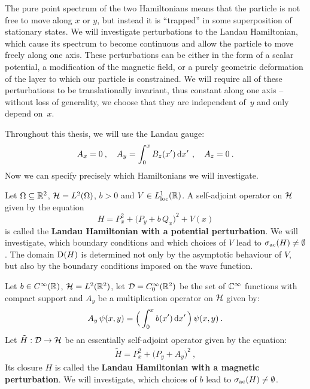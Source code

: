 The pure point spectrum of the two Hamiltonians means that the particle is not free to move along $x$ or $y$, but instead it is “trapped” in some superposition of stationary states. We will investigate perturbations to the Landau Hamiltonian, which cause its spectrum to become continuous and allow the particle to move freely along one axis. These perturbations can be either in the form of a scalar potential, a modification of the magnetic field, or a purely geometric deformation of the layer to which our particle is constrained. We will require all of these perturbations to be translationally invariant, thus constant along one axis – without loss of generality, we choose that they are independent of~$y$ and only depend on~$x$.

Throughout this thesis, we will use the Landau gauge:
\begin{align*}
    A_x = 0 \: , \quad
    A_y = \int_0^x B_z(x') \, \mathrm{d}x' \, \: , \quad
    A_z = 0 \: .
\end{align*}
Now we can specify precisely which Hamiltonians we will investigate.

\begin{defn}
    \label{defn-perturb-potential}
    Let $\Omega \subseteq \mathbb{R}^2$, $\mathcal{H} = L^2(\Omega)$, $b>0$ and $V \in L^1_{\text{loc}}(\mathbb{R})$. A self-adjoint operator on $\mathcal{H}$ given by the equation
    \begin{equation*}
        H
        = P^2_x
        + \big( P_y + b \, Q_x \big)^2
        + V(x)
    \end{equation*}
    is called the \textbf{Landau Hamiltonian with a potential perturbation}. We will investigate, which boundary conditions and which choices of $V$ lead to $\sigma_{\mathrm{ac}}(H) \neq \emptyset$. The domain $\mathrm{D}(H)$ is determined not only by the asymptotic behaviour of $V$, but also by the boundary conditions imposed on the wave function.
\end{defn}

\begin{defn}
    \label{defn-perturb-magnet}
    Let $b \in C^\infty(\mathbb{R})$, $\mathcal{H} = L^2(\mathbb{R}^2)$, let $\mathcal{D} = C^\infty_0(\mathbb{R}^2)$ be the set of $\mathbb{C}^\infty$ functions with compact support and $A_y$ be a multiplication operator on $\mathcal{H}$ given by:
    \begin{align*}
        A_y \, \psi(x, y) = \Big( \int_0^x b(x') \, \mathrm{d}x' \, \Big) \, \psi(x, y) \: .
    \end{align*}
    Let $\tilde H: \mathcal{D} \to \mathcal{H}$ be an essentially self-adjoint operator given by the equation:
    \begin{align*}
        \tilde H = P^2_x + \big( P_y + A_y \big)^2 \: ,
    \end{align*}
    Its closure $H$ is called the \textbf{Landau Hamiltonian with a magnetic perturbation}. We will investigate, which choices of $b$ lead to $\sigma_{\mathrm{ac}}(H) \neq \emptyset$.
\end{defn}

